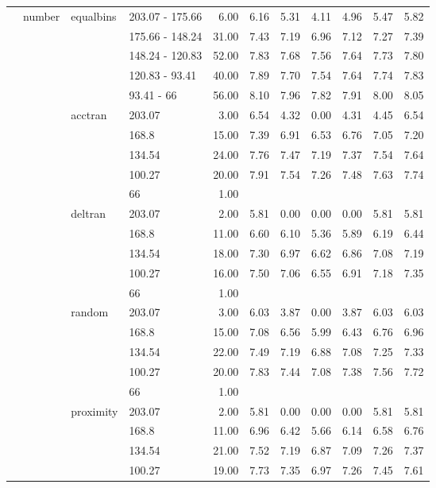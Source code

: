 \begin{longtable}{llllrrrrrrr}
   & number & equalbins & 203.07 - 175.66 & 6.00 & 6.16 & 5.31 & 4.11 & 4.96 & 5.47 & 5.82 \\ 
   &  &  & 175.66 - 148.24 & 31.00 & 7.43 & 7.19 & 6.96 & 7.12 & 7.27 & 7.39 \\ 
   &  &  & 148.24 - 120.83 & 52.00 & 7.83 & 7.68 & 7.56 & 7.64 & 7.73 & 7.80 \\ 
   &  &  & 120.83 - 93.41 & 40.00 & 7.89 & 7.70 & 7.54 & 7.64 & 7.74 & 7.83 \\ 
   &  &  & 93.41 - 66 & 56.00 & 8.10 & 7.96 & 7.82 & 7.91 & 8.00 & 8.05 \\ 
   &  & acctran & 203.07 & 3.00 & 6.54 & 4.32 & 0.00 & 4.31 & 4.45 & 6.54 \\ 
   &  &  & 168.8 & 15.00 & 7.39 & 6.91 & 6.53 & 6.76 & 7.05 & 7.20 \\ 
   &  &  & 134.54 & 24.00 & 7.76 & 7.47 & 7.19 & 7.37 & 7.54 & 7.64 \\ 
   &  &  & 100.27 & 20.00 & 7.91 & 7.54 & 7.26 & 7.48 & 7.63 & 7.74 \\ 
   &  &  & 66 & 1.00 &  &  &  &  &  &  \\ 
   &  & deltran & 203.07 & 2.00 & 5.81 & 0.00 & 0.00 & 0.00 & 5.81 & 5.81 \\ 
   &  &  & 168.8 & 11.00 & 6.60 & 6.10 & 5.36 & 5.89 & 6.19 & 6.44 \\ 
   &  &  & 134.54 & 18.00 & 7.30 & 6.97 & 6.62 & 6.86 & 7.08 & 7.19 \\ 
   &  &  & 100.27 & 16.00 & 7.50 & 7.06 & 6.55 & 6.91 & 7.18 & 7.35 \\ 
   &  &  & 66 & 1.00 &  &  &  &  &  &  \\ 
   &  & random & 203.07 & 3.00 & 6.03 & 3.87 & 0.00 & 3.87 & 6.03 & 6.03 \\ 
   &  &  & 168.8 & 15.00 & 7.08 & 6.56 & 5.99 & 6.43 & 6.76 & 6.96 \\ 
   &  &  & 134.54 & 22.00 & 7.49 & 7.19 & 6.88 & 7.08 & 7.25 & 7.33 \\ 
   &  &  & 100.27 & 20.00 & 7.83 & 7.44 & 7.08 & 7.38 & 7.56 & 7.72 \\ 
   &  &  & 66 & 1.00 &  &  &  &  &  &  \\ 
   &  & proximity & 203.07 & 2.00 & 5.81 & 0.00 & 0.00 & 0.00 & 5.81 & 5.81 \\ 
   &  &  & 168.8 & 11.00 & 6.96 & 6.42 & 5.66 & 6.14 & 6.58 & 6.76 \\ 
   &  &  & 134.54 & 21.00 & 7.52 & 7.19 & 6.87 & 7.09 & 7.26 & 7.37 \\ 
   &  &  & 100.27 & 19.00 & 7.73 & 7.35 & 6.97 & 7.26 & 7.45 & 7.61 \\ 

\end{longtable}
